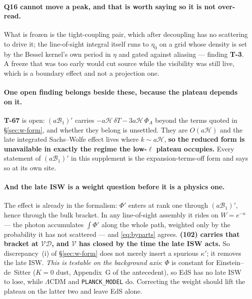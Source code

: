 \paragraph{Q16 cannot move a peak, and that is worth saying so it is not
over-read.} What is frozen is the tight-coupling pair, which after decoupling
has no scattering to drive it; the line-of-sight integral itself runs to
$\eta_0$ on a grid whose density is set by the Bessel kernel's own period in
$\eta$ and gated against aliasing --- finding \textbf{T-3}. A freeze that was
too early would cut source while the visibility was still live, which is a
boundary effect and not a projection one.

\paragraph{One open finding belongs beside these, because the plateau depends
on it.} \textbf{T-67} is open: $(a\mathcal B_1)'$ carries
$-a\mathcal H\,\delta T-3a\mathcal H\,\Phi_A$ beyond the terms quoted in
\S\ref{sec:w-form}, and whether they belong is unsettled. They are
$O(a\mathcal H)$ and the late integrated Sachs--Wolfe effect lives where
$k\sim a\mathcal H$, \textbf{so the reduced form is unavailable in exactly the
regime the low-$\ell$ plateau occupies.} Every statement of
$(a\mathcal B_1)'$ in this supplement is the expansion-terms-off form and says
so at its own site.

\paragraph{And the late ISW is a weight question before it is a physics one.}
The effect is already in the formalism: $\Phi'$ enters at rank one through
$(a\mathcal B_1)'$, hence through the bulk bracket. In any line-of-sight
assembly it rides on $W=e^{-\kappa}$ --- the photon accumulates $\int\Phi'$
along the whole path, weighted only by the probability it has not scattered
--- and \eqref{eq:byparts} agrees. \textbf{(102) carries that bracket at
$\mathcal V\mathcal D$, and $\mathcal V$ has closed by the time the late ISW
acts.} So discrepancy~(i) of \S\ref{sec:w-form} does not merely insert a
spurious $\kappa'$; it removes the late ISW. \emph{This is testable on the
background axis}: $\Phi$ is constant for Einstein--de~Sitter ($K=0$ dust,
Appendix~G of the antecedent), so EdS has no late ISW to lose, while
$\Lambda$CDM and \texttt{PLANCK\_MODEL} do. Correcting the weight should lift
the plateau on the latter two and leave EdS alone.

